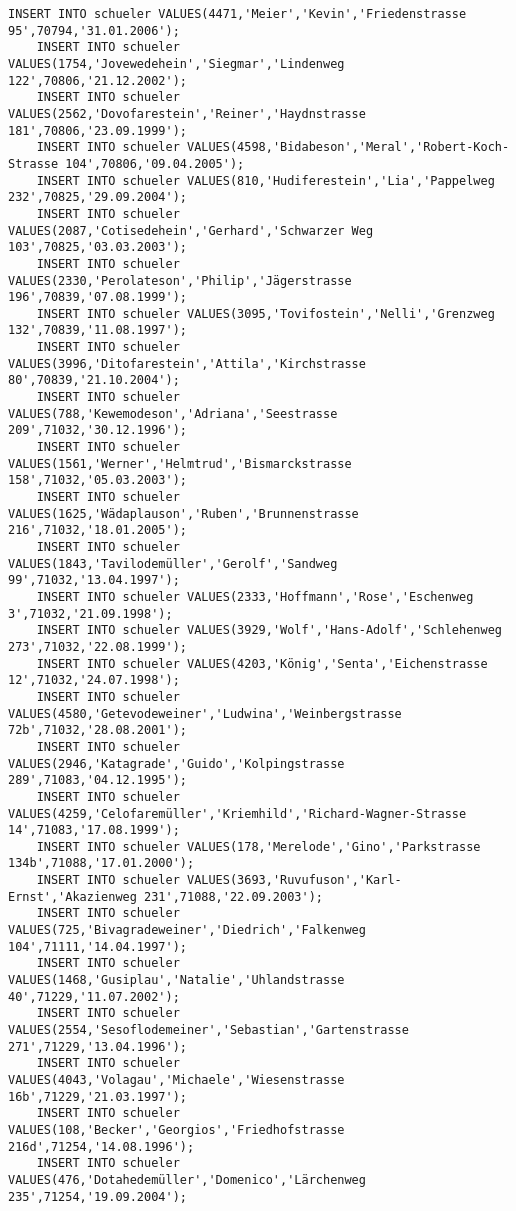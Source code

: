 \begin{lstlisting}[breaklines=True, numbers=none, basicstyle=\tiny, keepspaces=false]
	INSERT INTO schueler VALUES(4471,'Meier','Kevin','Friedenstrasse 95',70794,'31.01.2006');
	INSERT INTO schueler VALUES(1754,'Jovewedehein','Siegmar','Lindenweg 122',70806,'21.12.2002');
	INSERT INTO schueler VALUES(2562,'Dovofarestein','Reiner','Haydnstrasse 181',70806,'23.09.1999');
	INSERT INTO schueler VALUES(4598,'Bidabeson','Meral','Robert-Koch-Strasse 104',70806,'09.04.2005');
	INSERT INTO schueler VALUES(810,'Hudiferestein','Lia','Pappelweg 232',70825,'29.09.2004');
	INSERT INTO schueler VALUES(2087,'Cotisedehein','Gerhard','Schwarzer Weg 103',70825,'03.03.2003');
	INSERT INTO schueler VALUES(2330,'Perolateson','Philip','Jägerstrasse 196',70839,'07.08.1999');
	INSERT INTO schueler VALUES(3095,'Tovifostein','Nelli','Grenzweg 132',70839,'11.08.1997');
	INSERT INTO schueler VALUES(3996,'Ditofarestein','Attila','Kirchstrasse 80',70839,'21.10.2004');
	INSERT INTO schueler VALUES(788,'Kewemodeson','Adriana','Seestrasse 209',71032,'30.12.1996');
	INSERT INTO schueler VALUES(1561,'Werner','Helmtrud','Bismarckstrasse 158',71032,'05.03.2003');
	INSERT INTO schueler VALUES(1625,'Wädaplauson','Ruben','Brunnenstrasse 216',71032,'18.01.2005');
	INSERT INTO schueler VALUES(1843,'Tavilodemüller','Gerolf','Sandweg 99',71032,'13.04.1997');
	INSERT INTO schueler VALUES(2333,'Hoffmann','Rose','Eschenweg 3',71032,'21.09.1998');
	INSERT INTO schueler VALUES(3929,'Wolf','Hans-Adolf','Schlehenweg 273',71032,'22.08.1999');
	INSERT INTO schueler VALUES(4203,'König','Senta','Eichenstrasse 12',71032,'24.07.1998');
	INSERT INTO schueler VALUES(4580,'Getevodeweiner','Ludwina','Weinbergstrasse 72b',71032,'28.08.2001');
	INSERT INTO schueler VALUES(2946,'Katagrade','Guido','Kolpingstrasse 289',71083,'04.12.1995');
	INSERT INTO schueler VALUES(4259,'Celofaremüller','Kriemhild','Richard-Wagner-Strasse 14',71083,'17.08.1999');
	INSERT INTO schueler VALUES(178,'Merelode','Gino','Parkstrasse 134b',71088,'17.01.2000');
	INSERT INTO schueler VALUES(3693,'Ruvufuson','Karl-Ernst','Akazienweg 231',71088,'22.09.2003');
	INSERT INTO schueler VALUES(725,'Bivagradeweiner','Diedrich','Falkenweg 104',71111,'14.04.1997');
	INSERT INTO schueler VALUES(1468,'Gusiplau','Natalie','Uhlandstrasse 40',71229,'11.07.2002');
	INSERT INTO schueler VALUES(2554,'Sesoflodemeiner','Sebastian','Gartenstrasse 271',71229,'13.04.1996');
	INSERT INTO schueler VALUES(4043,'Volagau','Michaele','Wiesenstrasse 16b',71229,'21.03.1997');
	INSERT INTO schueler VALUES(108,'Becker','Georgios','Friedhofstrasse 216d',71254,'14.08.1996');
	INSERT INTO schueler VALUES(476,'Dotahedemüller','Domenico','Lärchenweg 235',71254,'19.09.2004');

\end{lstlisting}
